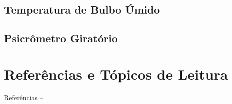 \subsection{Temperatura de Bulbo Úmido}

\subsection{Psicrômetro Giratório}

    \begin{frame}\vspace*{-2em}
        \vfill
        \vfill
    \end{frame}

\section{Referências e Tópicos de Leitura}

    \begin{frame}[allowframebreaks]{Referências -- }
        
        
    \end{frame}




